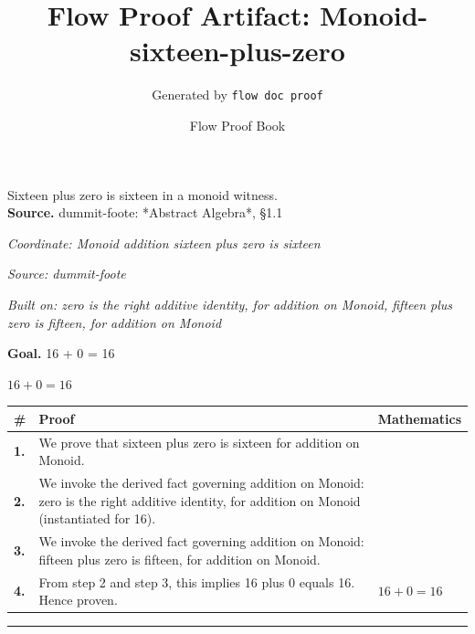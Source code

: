 \documentclass[11pt]{article}
\title{Flow Proof Artifact: Monoid-sixteen-plus-zero}
\author{Generated by \texttt{flow doc proof}}
\date{Flow Proof Book}
\theoremstyle{definition}
\begin{document}
\maketitle
Sixteen plus zero is sixteen in a monoid witness.\\[0.5em]
\textbf{Source.} dummit-foote: *Abstract Algebra*, §1.1\\[0.5em]
\bigskip
{}\par
\smallskip\noindent\textit{Coordinate: Monoid \cdot addition \cdot sixteen plus zero is sixteen}\par
\smallskip\noindent\textit{Source: dummit-foote}\par
\smallskip\noindent\textit{Built on: zero is the right additive identity, for addition on Monoid, fifteen plus zero is fifteen, for addition on Monoid}\par
\medskip
\noindent\textbf{Goal.} 16 + 0 = 16\par
\noindent$\displaystyle 16 + 0 = 16$\par
\medskip
\noindent
\begin{tabular}{@{} >{\raggedright\arraybackslash}p{} >{\raggedright\arraybackslash}p{} >{\raggedleft\arraybackslash}p{} @{}}
\textbf{\#} & \textbf{Proof} & \textbf{Mathematics} \\
\midrule
\textbf{1.} & We prove that sixteen plus zero is sixteen for addition on Monoid. & \\[0.45em]
\textbf{2.} & We invoke the derived fact governing addition on Monoid: zero is the right additive identity, for addition on Monoid (instantiated for 16). & \\[0.45em]
\textbf{3.} & We invoke the derived fact governing addition on Monoid: fifteen plus zero is fifteen, for addition on Monoid. & \\[0.45em]
\textbf{4.} & From step 2 and step 3, this implies 16 plus 0 equals 16. Hence proven. & $\displaystyle 16 + 0 = 16$ \\[0.45em]
\bottomrule
\end{tabular}
\label{thm:Monoid-addition-sixteen_plus_zero_is_sixteen}
\par\medskip\hrule
\end{document}
